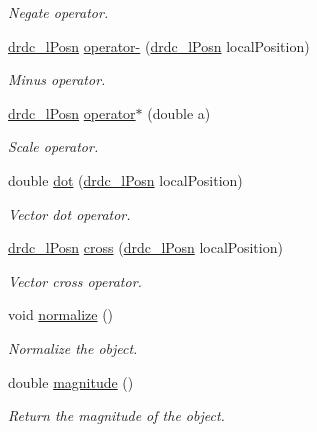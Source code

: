 \begin{CompactItemize}
\begin{CompactList}\small\item\em Negate operator. \item\end{CompactList}\item 
\hyperlink{classdrdc__lPosn}{drdc\_\-lPosn} \hyperlink{classdrdc__lPosn_56edc91463f7140e560a77a26539d5e1}{operator-} (\hyperlink{classdrdc__lPosn}{drdc\_\-lPosn} localPosition)
\begin{CompactList}\small\item\em Minus operator. \item\end{CompactList}\item 
\hyperlink{classdrdc__lPosn}{drdc\_\-lPosn} \hyperlink{classdrdc__lPosn_0b379c29cf404ffe8ee7f2c927e688c8}{operator$\ast$} (double a)
\begin{CompactList}\small\item\em Scale operator. \item\end{CompactList}\item 
double \hyperlink{classdrdc__lPosn_97a8281cc5a20e38b0ca91226e80595f}{dot} (\hyperlink{classdrdc__lPosn}{drdc\_\-lPosn} localPosition)
\begin{CompactList}\small\item\em Vector dot operator. \item\end{CompactList}\item 
\hyperlink{classdrdc__lPosn}{drdc\_\-lPosn} \hyperlink{classdrdc__lPosn_1fb0e2e37ecb3e79b416ce5a83a54ebb}{cross} (\hyperlink{classdrdc__lPosn}{drdc\_\-lPosn} localPosition)
\begin{CompactList}\small\item\em Vector cross operator. \item\end{CompactList}\item 
void \hyperlink{classdrdc__lPosn_2d0627c5961baeab891d62cb8a836d85}{normalize} ()
\begin{CompactList}\small\item\em Normalize the object. \item\end{CompactList}\item 
double \hyperlink{classdrdc__lPosn_a333c2527fc3ec4398ea0940bfc1c5fc}{magnitude} ()
\begin{CompactList}\small\item\em Return the magnitude of the object. \item\end{CompactList}\item 

\end{CompactItemize}
